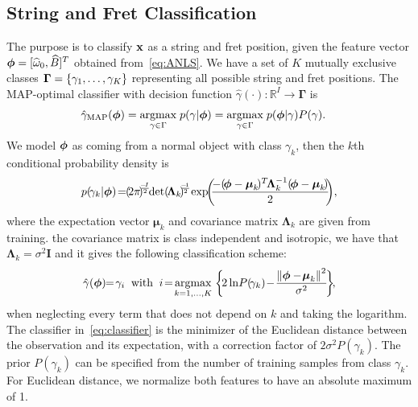 \documentclass{article}
\begin{document}
\subsection{String and Fret Classification} %
\label{sec:proposed_classification_of_string_and_fret}
The purpose is to classify $\mathbf x$ as a string and fret position, given the feature vector $\text{\boldmath$\phi$} = [\widehat\omega_0, \widehat B ]^T$ obtained from~\eqref{eq:ANLS}. We have a set of $K$ mutually exclusive classes ${\mbox{\boldmath $\Gamma$}}=\{\gamma_1,\dots,\gamma_K\}$ representing all possible string and fret positions. The MAP-optimal classifier with decision function $\hat{\gamma}(\cdot)\!:\! \mathbb{R}^I \!\!\!\rightarrow \!\!\boldsymbol{\Gamma}  $ is~\cite{mspr}
\begin{align}
    \hat\gamma_{\textup{MAP}}(\text{\boldmath$\phi$}) &= \underset{\gamma\in\Gamma}{\operatorname{argmax}}\;{p(\gamma|\text{\boldmath$\phi$})} = \underset{\gamma\in\Gamma}{\operatorname{argmax}}\;{p(\text{\boldmath$\phi$}|\gamma)P(\gamma)}.
\end{align}
We model $\text{\boldmath$\phi$}$ as coming from a normal object with class $\gamma_k$, then the $k$th conditional probability density is   
\begin{equation}
    p(\!\gamma_k\lvert\vecphi)\! = \!\! {{(\!2\pi\!)^{\!\!\frac{\!-\!I}{2}}\!\!\det{\!(\!\boldsymbol{\Lambda}_k\!)\!^{\!\frac{\!-\!1}{2}}\!\!}}}\, \exp\!\!\bigg(\!\!\frac{-(\!\vecphi-\boldsymbol{\mu}_k\!)^T\!\boldsymbol{\Lambda}_k^{-1} (\!\vecphi-\boldsymbol{\mu}_k\!) }{2}\!\! \bigg),
\end{equation}
where the expectation vector $\boldsymbol{\mu}_k$ and covariance matrix $\boldsymbol{\Lambda}_k$ are given from training.
%
%
the covariance matrix is class independent and isotropic, we have that $\boldsymbol{\Lambda}_k=\sigma^2\mathbf{I}$ and it gives the following classification scheme:
\begin{equation}\label{eq:classifier}
  \hat{\gamma}(\vecphi)\!\!=\!{\gamma}_i \;\; \textup{with} \;\; 
  i\!=\!\argmax{k=1,\dots,K}
  {\bigg\{\!
   2\ln\! P(\!\gamma_k)\! -\! \frac{\norm{\vecphi-\!\boldsymbol{\mu}_k}^2}{\sigma^2}\! \bigg\}}\!,
\end{equation}
when neglecting every term that does not depend on $k$ and taking the logarithm.
The classifier in~\eqref{eq:classifier} is the minimizer of the Euclidean distance between the observation and its expectation, with a correction factor of $2\sigma^2 P(\gamma_k)$. The prior $P(\gamma_k)$ can be specified from the number of training samples from class $\gamma_k$. For Euclidean distance, we normalize both features to have an absolute maximum of 1.
%
%
%
%
%
%
\end{document}
